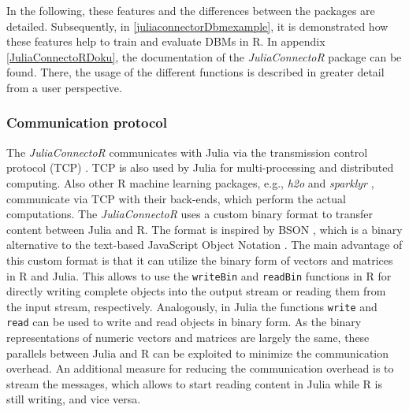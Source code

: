 \documentclass[12pt]{article}
\newcommand{\inlinecode}[1]{\texttt{#1}}
\newcommand{\apkg}[1]{\emph{#1}}
\begin{document}
In the following, these features and the differences between the packages are detailed.
Subsequently, in \ref{juliaconnectorDbmexample}, it is demonstrated how these features help to train and evaluate DBMs in R.
In appendix \ref{JuliaConnectoRDoku}, the documentation of the \apkg{JuliaConnectoR} package can be found.
There, the usage of the different functions is described in greater detail from a user perspective.

\subsubsection{Communication protocol}\label{juliaconnectorCommuncation}

The \apkg{JuliaConnectoR} communicates with Julia via the transmission control protocol (TCP) \citep{tcpspec}.
TCP is also used by Julia for multi-processing and distributed computing.
Also other R machine learning packages, e.g., \apkg{h2o} \citep{h2o} and \apkg{sparklyr} \citep{sparklyr}, communicate via TCP with their back-ends, which perform the actual computations.
The \apkg{JuliaConnectoR} uses a custom binary format to transfer content between Julia and R.
The format is inspired by BSON \citep{bsonspec}, which is a binary alternative to the text-based JavaScript Object Notation \citep{jsonspec1}.
The main advantage of this custom format is that it can utilize the binary form of vectors and matrices in R and Julia.
This allows to use the \inlinecode{writeBin} and \inlinecode{readBin} functions in R for directly writing complete objects into the output stream or reading them from the input stream, respectively.
Analogously, in Julia the functions \inlinecode{write} and \inlinecode{read} can be used to write and read objects in binary form.
As the binary representations of numeric vectors and matrices are largely the same, these parallels between Julia and R can be exploited to minimize the communication overhead.
An additional measure for reducing the communication overhead is to stream the messages, which allows to start reading content in Julia while R is still writing, and vice versa.
\end{document}
